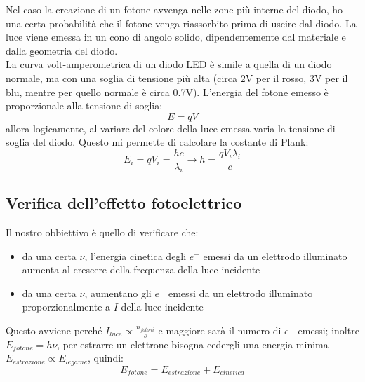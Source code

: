 \documentclass{article}
\begin{document}
Nel caso la creazione di un fotone avvenga nelle zone più interne del diodo, ho una certa probabilità che il fotone venga riassorbito prima di uscire dal diodo. La luce viene emessa in un cono di angolo solido, dipendentemente dal materiale e dalla geometria del diodo.
\\
La curva volt-amperometrica di un diodo LED è simile a quella di un diodo normale, ma con una soglia di tensione più alta (circa 2V per il rosso, 3V per il blu, mentre per quello normale è circa 0.7V). L'energia del fotone emesso è proporzionale alla tensione di soglia:
\[
E= q V
\]
allora logicamente, al variare del colore della luce emessa varia la tensione di soglia del diodo. Questo mi permette di calcolare la costante di Plank:
\[
E_i=q V_i = \frac{h c}{\lambda_i} \rightarrow h = \frac{q V_i \lambda_i}{c}
\]

\subsection{Verifica dell'effetto fotoelettrico}
Il nostro obbiettivo è quello di verificare che:
\begin{itemize}
\item da una certa $\nu$, l'energia cinetica degli $e^-$ emessi da un elettrodo illuminato aumenta al crescere della frequenza della luce incidente
\item da una certa $\nu$, aumentano gli $e^-$ emessi da un elettrodo illuminato proporzionalmente a $I$ della luce incidente
\end{itemize}
Questo avviene perché $I_{luce} \propto \frac{n_{fotoni}}{s}$ e maggiore sarà il numero di $e^-$ emessi; inoltre $E_{fotone} = h \nu$, per estrarre un elettrone bisogna cedergli una energia minima $E_{estrazione} \propto E_{legame}$, quindi:
\[
E_{fotone} = E_{estrazione} + E_{cinetica}
\]
\end{document}
